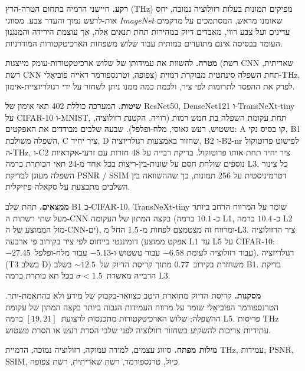 
\noindent\textbf{רקע.}\quad
חיישני הדמיה בתחום הטרה-הרץ (THz) מפיקים תמונות בעלות רזולוציה נמוכה,
יחס אות-לרעש נמוך והעדר צבע. מסווגי \emph{ImageNet} שאומנו מראש,
המסתמכים על מרקמים עדינים ועל צבע רווי, מאבדים דיוק במהירות תחת תנאים
אלה, אך עוצמת הירידה והמנגנון העומד בבסיסה אינם מתועדים כמותית עבור
שלוש משפחות הארכיטקטורות המודרניות.

\noindent\textbf{מטרה.}\quad
להשוות את עמידותן של שלוש ארכיטקטורות-עומק מייצגות (רשת CNN שאריתית,
רשת CNN צפופה, וטרנספורמר ראייה פוֹביאַלי) תחת השפלה סינתטית מבוקרת
דמוית-THz, לפרק את ההפסד לתרומות לפי ציר, ולכמת כמה ממנו ניתן לשחזר על
ידי רגולריזציית-אימון.

\noindent\textbf{שיטות.}\quad
המערכה כוללת 402 תאי אימון של ResNet50, DenseNet121 ו-TransNeXt-tiny על
CIFAR-10 ו-MNIST, תחת עקומת השפלה בת חמש רמות (רוויה, הקטנת רזולוציה,
טשטוש, רעש גאוסי, מלח-ופלפל). שבעה שלבים מבודדים את האפקטים: A קו בסיס
נקי, B1 השפלה משולבת, C ציר יחיד, D שחזור באמצעות רגולריזציה, B2 ו-B2-nr
לפישוט פרוטוקול ה-THz, ו-C2 ציר יחיד תחת אותו פרוטוקול. בדיקת רבייה
על 48 חזרות עם זרעי-אקראיות נוספים שולחת חסם על שונות-בין-ריצות בכל אחד
מ-24 תאי הכותרת ברמה L3. כל צינור השפלה מעוגן לבדיקת PSNR / SSIM
דטרמיניסטית על 256 תמונות, כך שההשוואה בין השלבים מתבצעת על סקאלה
פיזיקלית.

\noindent\textbf{ממצאים.}\quad
תחת שלב B1 ב-CIFAR-10, TransNeXt-tiny שומר על המרווח הרחב ביותר מעל שתי
רשתות ה-CNN בקצה המתון של העקומה (כ-$10.1\,$\Mpp{} ברמה L1, כ-$10.4\,$\Mpp{}
ברמה L2 מול הממוצע של ה-CNN-ים), ומרווח זה מצטמצם לפחות מ-$1.5\,$\Mpp{}
החל מ-L3. ציר הרזולוציה דומיננטי בייחוס לפי ציר בקירוב פי ארבעה
(אפקט ממוצע L1 עד L5 על CIFAR-10: $-27.45\,$\Mpp{} עבור רזולוציה לעומת
$-6.58$ עבור טשטוש ו-$-5.13$ עבור מלח-ופלפל). רגולריזציה (T3 בשלב D)
משחזרת בקירוב $0.77\,$\Mpp{} מתוך קריסת הדיוק של $\sim 12.5\,$\Mpp{} בשלב
B1. בדיקת הרבייה מאשרת $\sigma < 1.5\,$\Mpp{} בכל תא כותרת ברמה L3.

\noindent\textbf{מסקנות.}\quad
קריסת הדיוק מתוארת היטב כצוואר-בקבוק של מידע ולא כהתאמת-יתר. הטרנספורמר
הפוֹביאַלי שומר על מרווח העמידות הגבוה ביותר בקצה המתון של עקומת ההשפלה;
שלוש הארכיטקטורות מתכנסות לרצועת $[19, 21]\,$\Mpp{} ברמה L5. פריסות THz
עתידיות צריכות להשקיע בשחזור רזולוציה לפני שלבי הסרת רעש או הסרת טשטוש.

\noindent\textbf{מילות מפתח.}\quad
סיווג עצמים, למידה עמוקה, רזולוציה נמוכה, הדמיית THz, עמידות, PSNR, SSIM,
כיול, טרנספורמר, רשת שאריתית, רשת צפופה.
